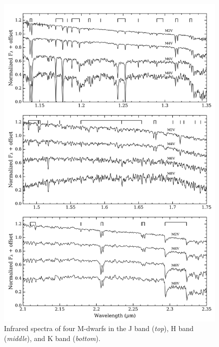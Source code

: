 \begin{figure}
\centering
\includegraphics[scale=0.7]{figures/Mdwarf_spectra.png}
\caption{Infrared spectra of four M-dwarfs in the J band (\emph{top}), H band 
(\emph{middle}), and K band (\emph{bottom}). \label{fig:spectra}}
\end{figure}

